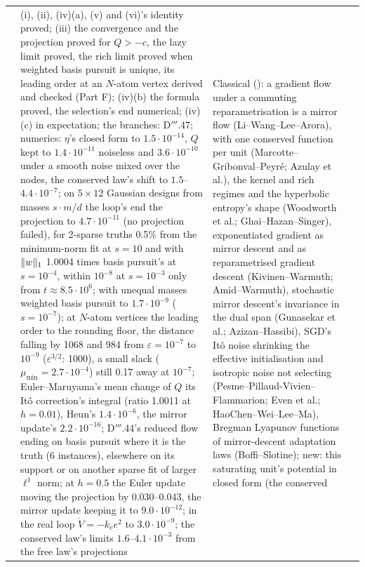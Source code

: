{\begin{longtable}{@{}>{\raggedright\arraybackslash}p{}>{\raggedright\arraybackslash}p{}%
>{\raggedright\arraybackslash}p{}>{\raggedright\arraybackslash}p{}@{}}
& (i), (ii), (iv)(a), (v) and (vi)'s identity proved; (iii) the convergence and the projection proved for $Q > -c$, the
lazy limit proved, the rich limit proved when weighted basis pursuit is unique, its leading order at an $N$-atom vertex
derived and checked (Part F); (iv)(b) the formula proved, the selection's end numerical; (iv)(c) in expectation; the
branches: D$'''$.47; numerics: $\eta$'s closed form to $1.5\cdot10^{-14}$, $Q$ kept to $1.4\cdot10^{-11}$ noiseless and
$3.6\cdot10^{-10}$ under a smooth noise mixed over the nodes, the conserved law's shift to $1.5$--$4.4\cdot10^{-7}$; on
$5\times12$ Gaussian designs from masses $s\cdot m/d$ the loop's end the projection to $4.7\cdot10^{-11}$ (no
projection failed), for 2-sparse truths 0.5\% from the minimum-norm fit at $s = 10$ and with $\lVert w\rVert_1$ 1.0004 times
basis pursuit's at $s = 10^{-4}$, within $10^{-8}$ at $s = 10^{-3}$ only from $t\approx8.5\cdot10^6$; with unequal
masses weighted basis pursuit to $1.7\cdot10^{-9}$ ($s = 10^{-7}$); at $N$-atom vertices the leading order to the
rounding floor, the distance falling by 1068 and 984 from $\varepsilon = 10^{-7}$ to $10^{-9}$ ($\varepsilon^{3/2}$:
1000), a small slack ($\mu_{\min} = 2.7\cdot10^{-4}$) still 0.17 away at $10^{-7}$; Euler--Maruyama's mean change of $Q$
its It\^o correction's integral (ratio 1.0011 at $h = 0.01$), Heun's $1.4\cdot10^{-6}$, the mirror update's
$2.2\cdot10^{-16}$; D$'''$.44's reduced flow ending on basis pursuit where it is the truth (6 instances), elsewhere on its
support or on another sparse fit of larger $\ell^1$ norm; at $h = 0.5$ the Euler update moving the projection by
0.030--0.043, the mirror update keeping it to $9.0\cdot10^{-12}$; in the real loop $\dot V = -k_ee^2$ to
$3.0\cdot10^{-9}$; the conserved law's limits $1.6$--$4.1\cdot10^{-3}$ from the free law's projections
& Classical (\cite{S72}): a gradient flow under a commuting reparametrisation is a mirror flow (Li--Wang--Lee--Arora),
with one conserved function per unit (Marcotte--Gribonval--Peyr\'e; Azulay et al.), the kernel and rich regimes and the
hyperbolic entropy's shape (Woodworth et al.; Ghai--Hazan--Singer), exponentiated gradient as mirror descent and as
reparametrised gradient descent (Kivinen--Warmuth; Amid--Warmuth), stochastic mirror descent's invariance in the dual
span (Gunasekar et al.; Azizan--Hassibi), SGD's It\^o noise shrinking the effective initialisation and isotropic noise
not selecting (Pesme--Pillaud-Vivien--Flammarion; Even et al.; HaoChen--Wei--Lee--Ma), Bregman Lyapunov functions of
mirror-descent adaptation laws (Boffi--Slotine); new: this saturating unit's potential in closed form (the conserved

\end{longtable}}
